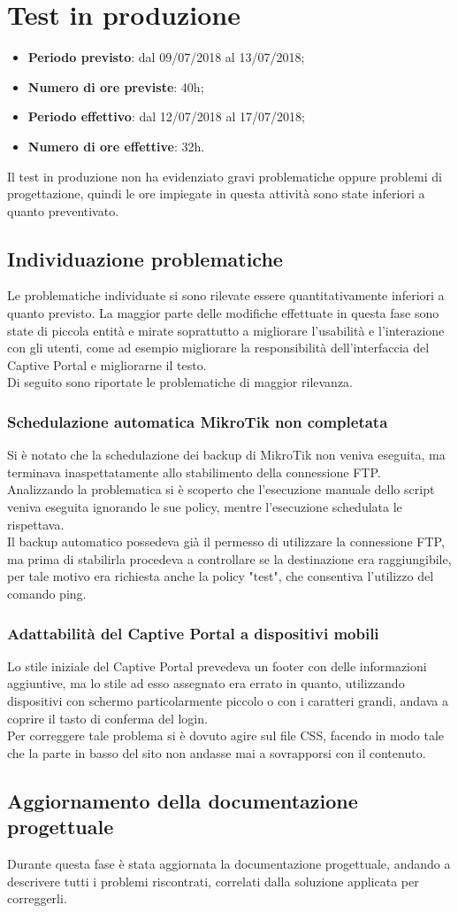 \documentclass[Realizzazione.tex]{subfiles}
\begin{document}
\section{Test in produzione}
\begin{itemize}
	\item \textbf{Periodo previsto}: dal 09/07/2018 al 13/07/2018;
	\item \textbf{Numero di ore previste}: 40h;
	\item \textbf{Periodo effettivo}: dal 12/07/2018 al 17/07/2018;
	\item \textbf{Numero di ore effettive}: 32h.
\end{itemize}
Il test in produzione non ha evidenziato gravi problematiche oppure problemi di progettazione, quindi le ore impiegate in questa attività sono state inferiori a quanto preventivato.

\subsection{Individuazione problematiche}
Le problematiche individuate si sono rilevate essere quantitativamente inferiori a quanto previsto. La maggior parte delle modifiche effettuate in questa fase sono state di piccola entità e mirate soprattutto a migliorare l'usabilità e l'interazione con gli utenti, come ad esempio migliorare la responsibilità dell'interfaccia del Captive Portal e migliorarne il testo.\\
Di seguito sono riportate le problematiche di maggior rilevanza.

\subsubsection{Schedulazione automatica MikroTik non completata}
Si è notato che la schedulazione dei backup di MikroTik non veniva eseguita, ma terminava inaspettatamente allo stabilimento della connessione FTP. \\
Analizzando la problematica si è scoperto che l'esecuzione manuale dello script veniva eseguita ignorando le sue policy, mentre l'esecuzione schedulata le rispettava.\\
Il backup automatico possedeva già il permesso di utilizzare la connessione FTP, ma prima di stabilirla procedeva a controllare se la destinazione era raggiungibile, per tale motivo era richiesta anche la policy "test", che consentiva l'utilizzo del comando ping.

\subsubsection{Adattabilità del Captive Portal a dispositivi mobili}
Lo stile iniziale del Captive Portal prevedeva un footer con delle informazioni aggiuntive, ma lo stile ad esso assegnato era errato in quanto, utilizzando dispositivi con schermo particolarmente piccolo o con i caratteri grandi, andava a coprire il tasto di conferma del login. \\
Per correggere tale problema si è dovuto agire sul file CSS, facendo in modo tale che la parte in basso del sito non andasse mai a sovrapporsi con il contenuto.

\subsection{Aggiornamento della documentazione progettuale}
Durante questa fase è stata aggiornata la documentazione progettuale, andando a descrivere tutti i problemi riscontrati, correlati dalla soluzione applicata per correggerli.
\end{document}
